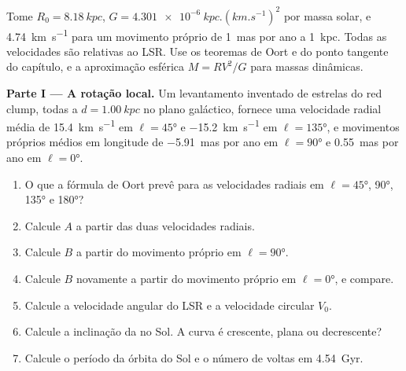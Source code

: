 \begin{problem}
\label{pb:b3:milky-way-galaxies:1}
Tome $R_0 = \qty{8.18}{kpc}$, $G = \qty{4.301e-6}{kpc.(km.s^{-1})^2}$ por
massa solar, e \qty{4.74}{km.s^{-1}} para um movimento próprio de
\qty{1}{mas} por ano a \qty{1}{kpc}. Todas as velocidades são relativas ao
LSR. Use os teoremas de Oort e do ponto tangente do capítulo, e a
aproximação esférica $M = RV^2/G$ para massas dinâmicas.

\medskip\noindent\textbf{Parte I --- A rotação local.} Um levantamento inventado
de estrelas do red clump, todas a $d = \qty{1.00}{kpc}$ no
plano galáctico, fornece uma velocidade radial média de \qty{+15.4}{km.s^{-1}} em
$\ell = \ang{45}$ e \qty{-15.2}{km.s^{-1}} em $\ell = \ang{135}$, e
movimentos próprios médios em longitude de \qty{-5.91}{mas} por ano em
$\ell = \ang{90}$ e \qty{+0.55}{mas} por ano em $\ell = \ang{0}$.
\begin{enumerate}
\item O que a fórmula de Oort prevê para as velocidades radiais em
  $\ell = \ang{45}$, \ang{90}, \ang{135} e \ang{180}?
\item Calcule $A$ a partir das duas velocidades radiais.
\item Calcule $B$ a partir do movimento próprio em $\ell = \ang{90}$.
\item Calcule $B$ novamente a partir do movimento próprio em $\ell = \ang{0}$, e
  compare.
\item Calcule a velocidade angular do LSR e a velocidade circular
  $V_0$.
\item Calcule a inclinação da  no Sol. A curva é
  crescente, plana ou decrescente?
\item Calcule o período da órbita do Sol e o número de voltas em
  \qty{4.54}{Gyr}.
\end{enumerate}


\end{problem}
